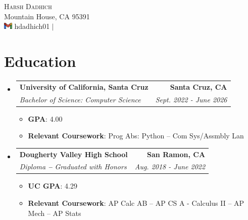 \documentclass[letterpaper,11pt]{article}
\makeatletter
\newcommand{\resumeSubheading}[4]{
  \vspace{-2pt}\item
    \begin{tabular*}{1.0\textwidth}[t]{l@{\extracolsep{\fill}}r}
      \textbf{#1} & \textbf{\small #2} \\
      \textit{\small#3} & \textit{\small #4} \\
    \end{tabular*}\vspace{-7pt}
}
\newcommand{\resumeSubHeadingListStart}{\begin{itemize}[leftmargin=0.0in, label={}]}
\newcommand{\resumeSubHeadingListEnd}{\end{itemize}}
\makeatother
\begin{document}

\begin{center}
	{\Huge \scshape Harsh Dadhich} \\ \vspace{1pt}
	Mountain House, CA 95391 \\ \vspace{1pt}
	\href{mailto:hdadhich01@gmail.com}{\includegraphics[height=9pt]{google-mail.png}} \href{https://linkedin.com/in/hdadhich01}{\faLinkedin} \href{https://github.com/hdadhich01}{\faGithub} hdadhich01 $|$ \href{tel:+12096371007}{\small \raisebox{-0.1\height}}
	\vspace{-15pt}
\end{center}

\section{Education}
\resumeSubHeadingListStart
\resumeSubheading
{University of California, Santa Cruz}{Santa Cruz, CA}
{Bachelor of Science: Computer Science}{Sept. 2022 - June 2026}
\begin{itemize}[itemsep=-1pt, parsep=1pt]
	\item\small \textbf{GPA}{: 4.00}
	\item \textbf{Relevant Coursework}{: Prog Abs: Python -- Com Sys/Assmbly Lan}
\end{itemize}
\resumeSubheading
{Dougherty Valley High School}{San Ramon, CA}
{Diploma \textbf{--} Graduated with Honors}{Aug. 2018 - June 2022}
\begin{itemize}[itemsep=-1pt, parsep=1pt]
	\item\small \textbf{UC GPA}{: 4.29}
	\item \textbf{Relevant Coursework}{: AP Calc AB -- AP CS A - Calculus II -- AP Mech -- AP Stats}
\end{itemize}
\resumeSubHeadingListEnd
\vspace{-15pt}
\end{document}
